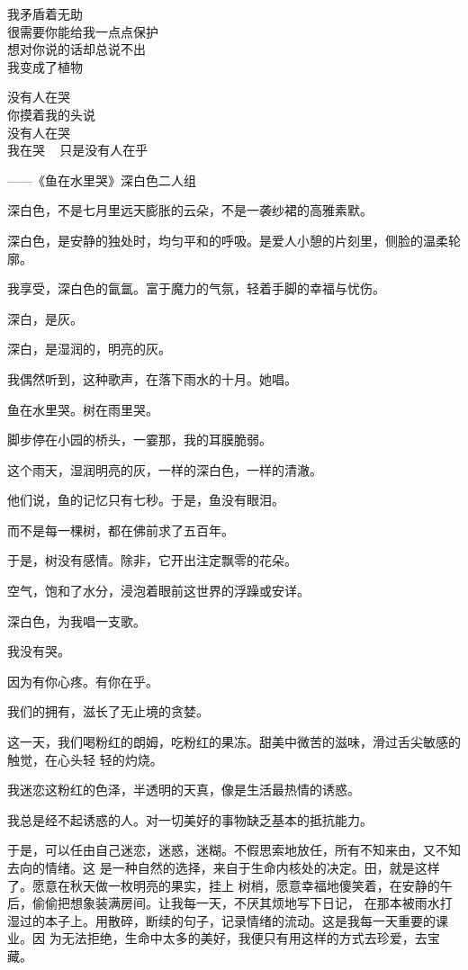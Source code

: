 			我矛盾着无助 \\
			很需要你能给我一点点保护 \\
			想对你说的话却总说不出 \\
			我变成了植物


			没有人在哭 \\
			你摸着我的头说 \\
			没有人在哭 \\
			我在哭 ~ 只是没有人在乎

			\hspace{4em} ——《鱼在水里哭》深白色二人组
		\endlongpoem


		深白色，不是七月里远天膨胀的云朵，不是一袭纱裙的高雅素默。\par
		深白色，是安静的独处时，均匀平和的呼吸。是爱人小憩的片刻里，侧脸的温柔轮廓。\par
		我享受，深白色的氤氲。富于魔力的气氛，轻着手脚的幸福与忧伤。\par
		深白，是灰。\par
		深白，是湿润的，明亮的灰。\par
		我偶然听到，这种歌声，在落下雨水的十月。她唱。\par
		鱼在水里哭。树在雨里哭。\par
		脚步停在小园的桥头，一霎那，我的耳膜脆弱。\par
		这个雨天，湿润明亮的灰，一样的深白色，一样的清澈。\par
		他们说，鱼的记忆只有七秒。于是，鱼没有眼泪。\par
		而不是每一棵树，都在佛前求了五百年。\par
		于是，树没有感情。除非，它开出注定飘零的花朵。\par
		空气，饱和了水分，浸泡着眼前这世界的浮躁或安详。\par
		深白色，为我唱一支歌。\par
		我没有哭。\par
		因为有你心疼。有你在乎。

	\endwriting



		我们的拥有，滋长了无止境的贪婪。

		这一天，我们喝粉红的朗姆，吃粉红的果冻。甜美中微苦的滋味，滑过舌尖敏感的触觉，在心头轻
	轻的灼烧。

		我迷恋这粉红的色泽，半透明的天真，像是生活最热情的诱惑。\par
		我总是经不起诱惑的人。对一切美好的事物缺乏基本的抵抗能力。

		于是，可以任由自己迷恋，迷惑，迷糊。不假思索地放任，所有不知来由，又不知去向的情绪。这
	是一种自然的选择，来自于生命内核处的决定。田，就是这样了。愿意在秋天做一枚明亮的果实，挂上
	树梢，愿意幸福地傻笑着，在安静的午后，偷偷把想象装满房间。让我每一天，不厌其烦地写下日记，
	在那本被雨水打湿过的本子上。用散碎，断续的句子，记录情绪的流动。这是我每一天重要的课业。因
	为无法拒绝，生命中太多的美好，我便只有用这样的方式去珍爱，去宝藏。

